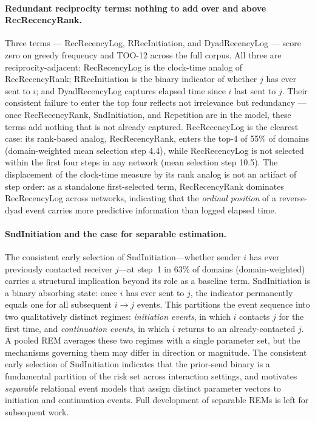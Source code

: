 \documentclass[11pt]{article}
\begin{document}
\paragraph{Redundant reciprocity terms: nothing to add over and above RecRecencyRank.}
Three terms --- RecRecencyLog, RRecInitiation, and DyadRecencyLog --- score
zero on greedy frequency and TOO-12 across the full corpus. All three are
reciprocity-adjacent: RecRecencyLog is the clock-time analog of RecRecencyRank;
RRecInitiation is the binary indicator of whether $j$ has ever sent to $i$; and
DyadRecencyLog captures elapsed time since $i$ last sent to $j$. Their
consistent failure to enter the top four reflects not irrelevance but
redundancy --- once RecRecencyRank, SndInitiation, and Repetition are in the
model, these terms add nothing that is not already captured. RecRecencyLog is
the clearest case: its rank-based analog, RecRecencyRank, enters the top-4 of
55\% of domains (domain-weighted mean selection step 4.4), while RecRecencyLog
is not selected within the first four steps in any network (mean selection step
10.5). The displacement of the clock-time measure by its rank analog is not an
artifact of step order: as a standalone first-selected term, RecRecencyRank
dominates RecRecencyLog across networks, indicating that the \emph{ordinal
position} of a reverse-dyad event carries more predictive information than
logged elapsed time.

\paragraph{SndInitiation and the case for separable estimation.}
The consistent early selection of SndInitiation---whether sender $i$ has ever
previously contacted receiver $j$---at step~1 in 63\% of domains (domain-weighted)
carries a structural implication beyond its role as a baseline term.
SndInitiation is a binary absorbing state: once $i$ has ever sent to $j$, the
indicator permanently equals one for all subsequent $i \to j$ events. This
partitions the event sequence into two qualitatively distinct regimes:
\emph{initiation events}, in which $i$ contacts $j$ for the first time, and
\emph{continuation events}, in which $i$ returns to an already-contacted $j$.
A pooled REM averages these two regimes with a single parameter set, but the
mechanisms governing them may differ in direction or magnitude. The consistent early selection of SndInitiation indicates
that the prior-send binary is a fundamental partition of the risk set across
interaction settings, and motivates \emph{separable} relational event models
that assign distinct parameter vectors to initiation and continuation events.
Full development of separable REMs is left for subsequent work.
\end{document}
